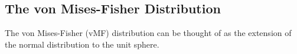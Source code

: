 \subsection{The von Mises-Fisher Distribution}

The von Mises-Fisher (vMF) distribution can be thought of as the extension of the normal distribution to the unit sphere.
